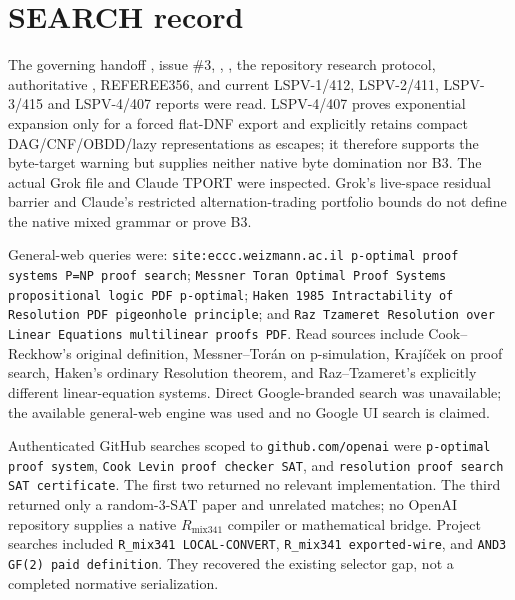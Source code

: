 \documentclass[11pt]{article}
\begin{document}
\section{SEARCH record}

The governing handoff , issue \#3, , , the repository research protocol, authoritative , REFEREE356, and current LSPV-1/412, LSPV-2/411, LSPV-3/415 and LSPV-4/407 reports were read.  LSPV-4/407 proves exponential expansion only for a forced flat-DNF export and explicitly retains compact DAG/CNF/OBDD/lazy representations as escapes; it therefore supports the byte-target warning but supplies neither native byte domination nor B3.  The actual Grok file  and Claude TPORT  were inspected.  Grok's live-space residual barrier and Claude's restricted alternation-trading portfolio bounds do not define the native mixed grammar or prove B3.

General-web queries were: \texttt{site:eccc.weizmann.ac.il p-optimal proof systems P=NP proof search}; \texttt{Messner Toran Optimal Proof Systems propositional logic PDF p-optimal}; \texttt{Haken 1985 Intractability of Resolution PDF pigeonhole principle}; and \texttt{Raz Tzameret Resolution over Linear Equations multilinear proofs PDF}.  Read sources include Cook--Reckhow's original definition, Messner--Tor\'an on p-simulation, Kraj\'i\v cek on proof search, Haken's ordinary Resolution theorem, and Raz--Tzameret's explicitly different linear-equation systems.  Direct Google-branded search was unavailable; the available general-web engine was used and no Google UI search is claimed.

Authenticated GitHub searches scoped to \texttt{github.com/openai} were \texttt{p-optimal proof system}, \texttt{Cook Levin proof checker SAT}, and \texttt{resolution proof search SAT certificate}.  The first two returned no relevant implementation.  The third returned only a random-3-SAT paper and unrelated matches; no OpenAI repository supplies a native $R_{\mathrm{mix341}}$ compiler or mathematical bridge.  Project searches included \texttt{R\_mix341 LOCAL-CONVERT}, \texttt{R\_mix341 exported-wire}, and \texttt{AND3 GF(2) paid definition}.  They recovered the existing selector gap, not a completed normative serialization.
\end{document}
